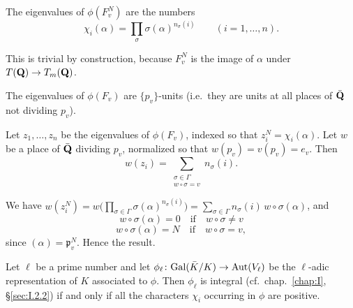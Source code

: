 \begin{proposition}[1]\label{prop:II.3.4.1}
The eigenvalues of $\phi(F_v^N)$ are the numbers
\[
\chi_i(\alpha) = \prod_\sigma \sigma(\alpha)^{n_\sigma(i)} \qquad
(i = 1, \ldots, n).
\]
\end{proposition}

This is trivial by construction, because $F_v^N$ is the image of
$\alpha$ under $T(\mathbf{Q}) \to T_m(\mathbf{Q})$.

\begin{corollary}[1]\label{cor:II.3.4.1}
The eigenvalues of $\phi(F_v)$ are $\{p_v\}$-units (i.e.~they are units
at all places of $\bar{\mathbf{Q}}$ not dividing $p_v$).
\end{corollary}

\begin{corollary}[2]\label{cor:II.3.4.2}
Let $z_1, \ldots, z_n$ be the eigenvalues of $\phi(F_v)$, indexed so that
$z_i^N = \chi_i(\alpha)$.  Let $w$ be a place of $\bar{\mathbf{Q}}$ dividing
$p_v$, normalized so that $w(p_v) = v(p_v) = e_v$.  Then
\[
w(z_i) = \sum_{\substack{\sigma \in \Gamma \\ w \circ \sigma = v}}
n_\sigma(i).
\]
\end{corollary}

We have
$w(z_i^N) = w\bigl(\prod\limits_{\sigma \in \Gamma}
\sigma(\alpha)^{n_\sigma(i)}\bigr) = \sum\limits_{\sigma \in \Gamma}
n_\sigma(i)\, w \circ \sigma(\alpha)$, and
\[
w \circ \sigma(\alpha) = 0 \quad\text{if}\quad w \circ \sigma \neq v
\]
\[
w \circ \sigma(\alpha) = N \quad\text{if}\quad w \circ \sigma = v,
\]
since $(\alpha) = \mathfrak{p}_v^N$.  Hence the result.

\begin{corollary}[3]\label{cor:II.3.4.3}
Let $\ell$ be a prime number and let
$\phi_\ell\colon \mathrm{Gal}(\bar{K}/K) \to \mathrm{Aut}(V_\ell)$ be the $\ell$-adic
representation of $K$ associated to $\phi$.  Then $\phi_\ell$ is
integral (cf.~chap.~\ref{chap:I}, \S\ref{sec:I.2.2}) if and only if all
the characters $\chi_i$ occurring in $\phi$ are positive.
\end{corollary}

